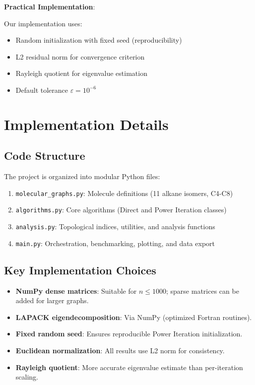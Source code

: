 \documentclass[12pt]{article}
\begin{document}
\textbf{Practical Implementation}:

Our implementation uses:
\begin{itemize}
    \item Random initialization with fixed seed (reproducibility)
    \item L2 residual norm for convergence criterion
    \item Rayleigh quotient for eigenvalue estimation
    \item Default tolerance $\varepsilon = 10^{-6}$
\end{itemize}

\section{Implementation Details}

\subsection{Code Structure}

The project is organized into modular Python files:

\begin{enumerate}
    \item \texttt{molecular\_graphs.py}: Molecule definitions (11 alkane isomers, C4-C8)
    \item \texttt{algorithms.py}: Core algorithms (Direct and Power Iteration classes)
    \item \texttt{analysis.py}: Topological indices, utilities, and analysis functions
    \item \texttt{main.py}: Orchestration, benchmarking, plotting, and data export
\end{enumerate}

\subsection{Key Implementation Choices}

\begin{itemize}
    \item \textbf{NumPy dense matrices}: Suitable for $n \leq 1000$; sparse matrices can be added for larger graphs.
    \item \textbf{LAPACK eigendecomposition}: Via NumPy (optimized Fortran routines).
    \item \textbf{Fixed random seed}: Ensures reproducible Power Iteration initialization.
    \item \textbf{Euclidean normalization}: All results use L2 norm for consistency.
    \item \textbf{Rayleigh quotient}: More accurate eigenvalue estimate than per-iteration scaling.
\end{itemize}
\end{document}
